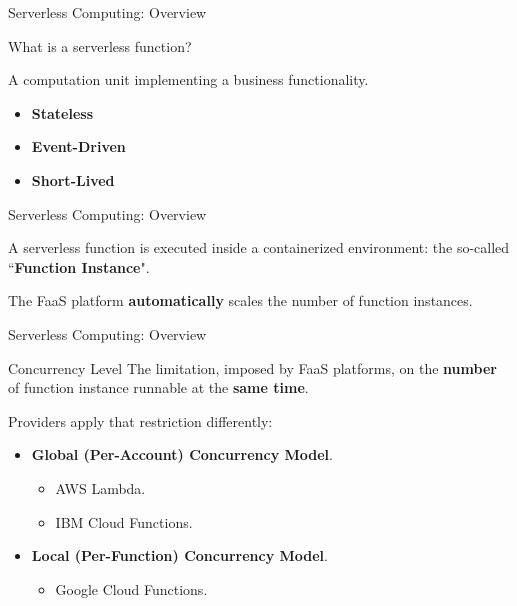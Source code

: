 \documentclass[13.5pt]{beamer}
\newcommand{\B}[1]{\textcolor{TorVergataColor}{\textbf{#1}}}
\begin{document}
\begin{frame}{Serverless Computing: Overview}
	
	\begin{block}{}
		\centering
		What is a serverless function?
	\end{block}
	\vspace{\baselineskip}
	A computation unit implementing a business functionality.
	
	\begin{itemize}
		\item \B{Stateless}
		\item \B{Event-Driven}
		\item \B{Short-Lived}
	\end{itemize}

	\vspace{\baselineskip}
	
\end{frame} 
\begin{frame}{Serverless Computing: Overview}
	
	\begin{block}{}
		\centering
		A serverless function is executed inside a containerized environment: the so-called ``\B{Function Instance}".
	\end{block}
	\vspace{\baselineskip}
	
	\begin{block}{}
		\centering
		The FaaS platform \B{automatically} scales the number of function instances.
	\end{block}
		
\end{frame} 
\begin{frame}{Serverless Computing: Overview}
	
	\begin{block}{Concurrency Level}
		The limitation, imposed by FaaS platforms, on the \B{number} of function instance runnable at the \B{same time}.
	\end{block}
	\vspace{\baselineskip}
	Providers apply that restriction differently:
	\vspace{\baselineskip}
	\begin{itemize}
		\item \B{Global (Per-Account) Concurrency Model}.
		\begin{itemize}
			\item AWS Lambda. 
			\item IBM Cloud Functions.
		\end{itemize}
		\vspace{\baselineskip}
		\item \B{Local (Per-Function) Concurrency Model}.
		\begin{itemize}
			\item Google Cloud Functions.
		\end{itemize}
	\end{itemize}

\end{frame} 
\end{document}
